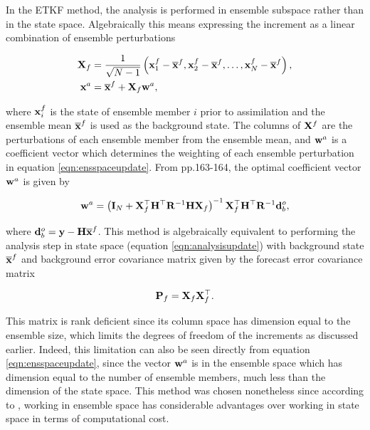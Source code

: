 In the ETKF method, the analysis is performed in ensemble subspace rather than in the state space. Algebraically this means expressing the increment as a linear combination of ensemble perturbations

\begin{align}
\mathbf{X}_f &= \frac{1}{\sqrt{N- 1}} \left( \mathbf{x}^f_1 - \overline{\mathbf{x}}^f, \mathbf{x}^f_2 - \overline{\mathbf{x}}^f, \dots, \mathbf{x}^f_N - \overline{\mathbf{x}}^f \right),  \label{eqn:ensperturbations}\\
\mathbf{x}^a &= \overline{\mathbf{x}}^f + \mathbf{X}_f \mathbf{w}^a, \label{eqn:ensspaceupdate}
\end{align}

where $\mathbf{x}^f_i$ is the state of ensemble member $i$ prior to assimilation and the ensemble mean $\overline{\mathbf{x}}^f$ is used as the background state. The columns of $\mathbf{X}^f$ are the perturbations of each ensemble member from the ensemble mean, and $\mathbf{w}^a$ is a coefficient vector which determines the weighting of each ensemble perturbation in equation \ref{eqn:ensspaceupdate}. From \citet{Asch2016} pp.163-164, the optimal coefficient vector $\mathbf{w}^a$ is given by

\begin{equation}
\mathbf{w}^a = \left( \mathbf{I}_N + \mathbf{X}_f^\top \mathbf{H}^\top \mathbf{R}^{-1} \mathbf{H} \mathbf{X}_f \right) ^{-1} \mathbf{X}_f^\top \mathbf{H}^\top \mathbf{R}^{-1} \mathbf{d}^o_b,
\label{eqn:ETKFinc}
\end{equation}

where $\mathbf{d}^o_b = \mathbf{y} - \mathbf{H} \overline{\mathbf{x}}^f$. This method is algebraically equivalent to performing the analysis step in state space (equation \ref{eqn:analysisupdate}) with background state $\overline{\mathbf{x}}^f$ and background error covariance matrix given by the forecast error covariance matrix

\begin{equation}
\mathbf{P}_f = \mathbf{X}_f \mathbf{X}_f^\top .
\label{eqn:ferrorcov}
\end{equation}

This matrix is rank deficient since its column space has dimension equal to the ensemble size, which limits the degrees of freedom of the increments as discussed earlier. Indeed, this limitation can also be seen directly from equation \ref{eqn:ensspaceupdate}, since the vector $\mathbf{w}^a$ is in the ensemble space which has dimension equal to the number of ensemble members, much less than the dimension of the state space. This method was chosen nonetheless since according to \citet{Hunt2007}, working in ensemble space has considerable advantages over working in state space in terms of computational cost.


